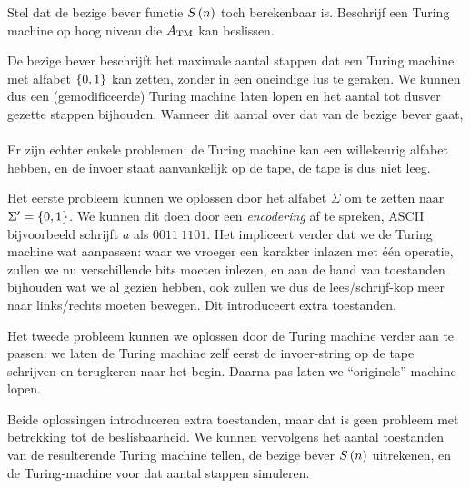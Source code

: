 \documentclass{article}
\begin{document}
\begin{question}
Stel dat de bezige bever functie $S\left( n \right)$ toch berekenbaar is. Beschrijf een Turing machine op hoog niveau die $A_{\rm TM}$ kan beslissen.
\begin{answer}
De bezige bever beschrijft het maximale aantal stappen dat een Turing machine met alfabet $\left\{ 0,1 \right\}$ kan zetten, zonder in een oneindige lus te geraken. We kunnen dus een (gemodificeerde) Turing machine laten lopen en het aantal tot dusver gezette stappen bijhouden. Wanneer dit aantal over dat van de bezige bever gaat, 

\paragraph{}
Er zijn echter enkele problemen: de Turing machine kan een willekeurig alfabet hebben, en de invoer staat aanvankelijk op de tape, de tape is dus niet leeg.


Het eerste probleem kunnen we oplossen door het alfabet $\Sigma$ om te zetten naar $\Sigma'=\left\{ 0,1 \right\}$. We kunnen dit doen door een \emph{encodering} af te spreken, ASCII bijvoorbeeld schrijft $a$ als $0011\ 1101$. Het impliceert verder dat we de Turing machine wat aanpassen: waar we vroeger een karakter inlazen met \'e\'en operatie, zullen we nu verschillende bits moeten inlezen, en aan de hand van toestanden bijhouden wat we al gezien hebben, ook zullen we dus de lees/schrijf-kop meer naar links/rechts moeten bewegen. Dit introduceert extra toestanden.


Het tweede probleem kunnen we oplossen door de Turing machine verder aan te passen: we laten de Turing machine zelf eerst de invoer-string op de tape schrijven en terugkeren naar het begin. Daarna pas laten we ``originele'' machine lopen.


Beide oplossingen introduceren extra toestanden, maar dat is geen probleem met betrekking tot de beslisbaarheid. We kunnen vervolgens het aantal toestanden van de resulterende Turing machine tellen, de bezige bever $S\left( n \right)$ uitrekenen, en de Turing-machine voor dat aantal stappen simuleren.
\end{answer}
\end{question}
\end{document}
